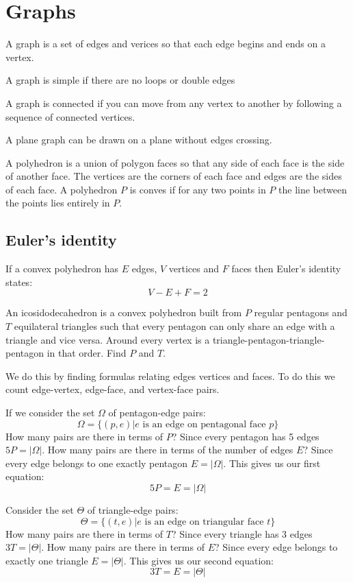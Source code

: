 \documentclass{article}
\begin{document}
\section{Graphs}

A graph is a set of edges and verices so that each edge begins and ends on a vertex.

A graph is simple if there are no loops or double edges

A graph is connected if you can move from any vertex to another by following a sequence of connected vertices.

A plane graph can be drawn on a plane without edges crossing.

A polyhedron is a union of polygon faces so that any side of each face is the side of another face. The vertices are the corners of each face and edges are the sides of each face. A polyhedron \(P\) is conves if for any two points in \(P\) the line between the points lies entirely in \(P\).

\subsection*{Euler's identity}

If a convex polyhedron has \(E\) edges, \(V\) vertices and \(F\) faces then Euler's identity states:
\[V-E+F=2\]

An icosidodecahedron is a convex polyhedron built from \(P\) regular pentagons and \(T\) equilateral triangles such that every pentagon can only share an edge with a triangle and vice versa. Around every vertex is a triangle-pentagon-triangle-pentagon in that order. Find \(P\) and \(T\).

We do this by finding formulas relating edges vertices and faces. To do this we count edge-vertex, edge-face, and vertex-face pairs.

If we consider the set \(\Omega\) of pentagon-edge pairs:
\[\Omega=\{(p,e)|e\text{ is an edge on pentagonal face }p\}\]
How many pairs are there in terms of \(P\)? Since every pentagon has 5 edges \(5P=|\Omega|\). How many pairs are there in terms of the number of edges \(E\)? Since every edge belongs to one exactly pentagon \(E= |\Omega|\). This gives us our first equation:
\[5P=E=|\Omega|\tag{12.1}\]

Consider the set \(\Theta\) of triangle-edge pairs:
\[\Theta=\{(t,e)|e\text{ is an edge on triangular face }t\}\]
How many pairs are there in terms of \(T\)? Since every triangle has 3 edges \(3T=|\Theta|\). How many pairs are there in terms of \(E\)? Since every edge belongs to exactly one triangle \(E=|\Theta|\). This gives us our second equation:
\[3T=E=|\Theta|\tag{12.2}\]
\end{document}
